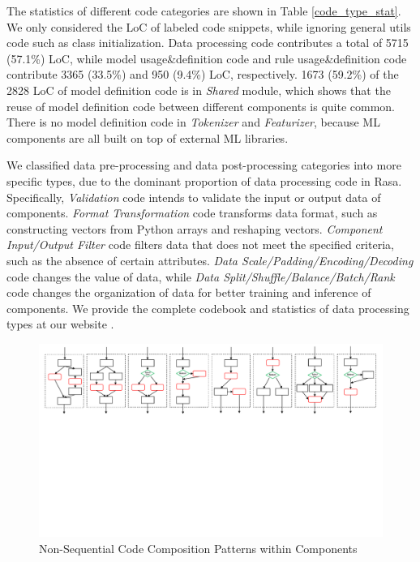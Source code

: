 The statistics of different code categories are shown in Table \ref{code_type_stat}. We only considered the LoC of labeled code snippets, while ignoring general utils code such as class initialization. 
Data processing code contributes a total of 5715 (57.1\%) LoC, while model usage\&definition code and rule usage\&definition code contribute 3365 (33.5\%) and 950 (9.4\%) LoC, respectively. 
1673 (59.2\%) of the 2828 LoC of model definition code is in  \textit{Shared} module, which shows that the reuse of model definition code between different components is quite common. There is no model definition code in \textit{Tokenizer} and \textit{Featurizer}, because ML components are all built on top of external ML libraries.


We classified data pre-processing and data post-processing categories into more specific types, due to the dominant proportion of data processing code in Rasa. 
Specifically, \textit{Validation} code intends to validate the input or output data of components. \textit{Format Transformation} code transforms data format, such as constructing vectors from Python arrays and reshaping vectors. 
\textit{Component Input/Output Filter} code filters data that does not meet the specified criteria, such as the absence of certain attributes. 
\textit{Data Scale/Padding/Encoding/Decoding} code changes the value of data, while \textit{Data Split/Shuffle/Balance/Batch/Rank} code changes the organization of data for better training and inference of components.
We provide the complete codebook and statistics of data processing types at our website \cite{website}.

\begin{figure}[ht]
    \centering
    \includegraphics[scale=0.53]{figs/code_composition.pdf}
    \vspace{-10pt}
    \caption{Non-Sequential Code Composition Patterns within Components}
    \label{code_composition}
\end{figure}

